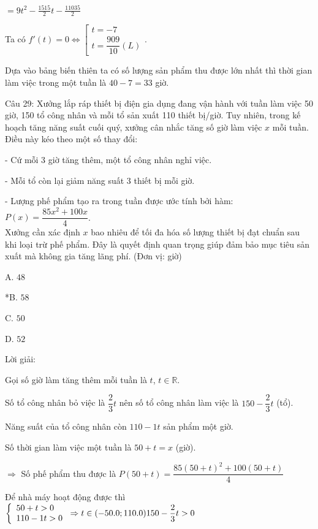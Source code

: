 \documentclass[a4paper,12pt]{article}
\begin{document}
\(= 9t^{2} - \frac{1515}{2}t - \frac{11035}{2}\)

Ta có \(f'(t) = 0 \Leftrightarrow \left[\begin{array}{l}t = -7 \\ t = \dfrac{909}{10}(L)\end{array}\right.\).

Dựa vào bảng biến thiên ta có số lượng sản phẩm thu được lớn nhất thì thời gian làm việc trong một tuần là \(40 - 7 = 33\) giờ.




Câu 29: Xưởng lắp ráp thiết bị điện gia dụng đang vận hành với tuần làm việc 50 giờ, 150 tổ công nhân và mỗi tổ sản xuất 110 thiết bị/giờ. Tuy nhiên, trong kế hoạch tăng năng suất cuối quý, xưởng cân nhắc tăng số giờ làm việc \(x\) mỗi tuần. Điều này kéo theo một số thay đổi:

- Cứ mỗi 3 giờ tăng thêm, một tổ công nhân nghỉ việc.

- Mỗi tổ còn lại giảm năng suất 3 thiết bị mỗi giờ.

- Lượng phế phẩm tạo ra trong tuần được ước tính bởi hàm: \( P(x) = \dfrac{85x^2 + 100x}{4} \).\\Xưởng cần xác định \(x\) bao nhiêu để tối đa hóa số lượng thiết bị đạt chuẩn sau khi loại trừ phế phẩm. Đây là quyết định quan trọng giúp đảm bảo mục tiêu sản xuất mà không gia tăng lãng phí. (Đơn vị: giờ)

A. \(48\)

*B. \(58\)

C. \(50\)

D. \(52\)

Lời giải:


Gọi số giờ làm tăng thêm mỗi tuần là \(t\), \(t \in \mathbb{R}\).

Số tổ công nhân bỏ việc là \(\dfrac{2}{3} t\) nên số tổ công nhân làm việc là \(150 - \dfrac{2}{3} t\) (tổ).

Năng suất của tổ công nhân còn \(110 - 1 t\) sản phẩm một giờ.

Số thời gian làm việc một tuần là \(50 + t = x\) (giờ).

\(\Rightarrow\) Số phế phẩm thu được là \(P(50 + t) = \dfrac{85(50 + t)^2 + 100(50 + t)}{4}\)

Để nhà máy hoạt động được thì \(\left\{\begin{array}{l}50 + t > 0 \\ 110 - 1 t > 0\end{array}\right. \Rightarrow t \in(-50.0 ; 110.0) \\ 150 - \dfrac{2}{3} t > 0\)
\end{document}
